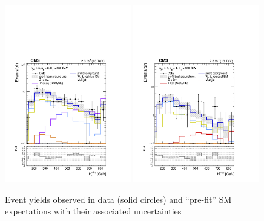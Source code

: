 \begin{figure}[tbhp]
  \begin{center}
    \includegraphics[width=0.49\textwidth]{figures/mht_shapes/v2/postFitShape_eq0b_ge5j_800_Inf_prefit} 
    \includegraphics[width=0.49\textwidth]{figures/mht_shapes/v2/postFitShape_eq1b_ge5j_800_Inf_prefit} \\
  \end{center}
  \caption{Event yields observed in data (solid circles) and
    ``pre-fit'' SM expectations with their associated uncertainties
}
\end{figure}
